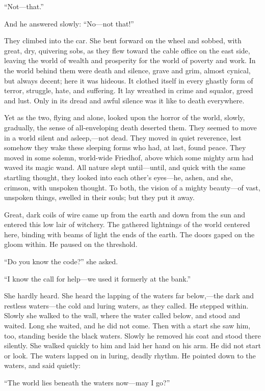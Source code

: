 ``Not---that.''

And he answered slowly: ``No---not that!''

They climbed into the car. She bent forward on the wheel and
sobbed, with great, dry, quivering sobs, as they flew toward the
cable office on the east side, leaving the world of wealth and
prosperity for the world of poverty and work. In the world
behind them were death and silence, grave and grim, almost
cynical, but always decent; here it was hideous. It clothed
itself in every ghastly form of terror, struggle, hate, and
suffering. It lay wreathed in crime and squalor, greed and lust.
Only in its dread and awful silence was it like to death
everywhere.

Yet as the two, flying and alone, looked upon the horror of the
world, slowly, gradually, the sense of all-enveloping death
deserted them. They seemed to move in a world silent and
asleep,---not dead. They moved in quiet reverence, lest somehow
they wake these sleeping forms who had, at last, found peace.
They moved in some solemn, world-wide Friedhof, above which some
mighty arm had waved its magic wand. All nature slept
until---until, and quick with the same startling thought, they
looked into each other's eyes---he, ashen, and she, crimson, with
unspoken thought. To both, the vision of a mighty beauty---of
vast, unspoken things, swelled in their souls; but they put it
away.

Great, dark coils of wire came up from the earth and down from
the sun and entered this low lair of witchery. The gathered
lightnings of the world centered here, binding with beams of
light the ends of the earth. The doors gaped on the gloom
within. He paused on the threshold.

``Do you know the code?'' she asked.

``I know the call for help---we used it formerly at the bank.''

She hardly heard. She heard the lapping of the waters far
below,---the dark and restless waters---the cold and luring waters,
as they called. He stepped within. Slowly she walked to the
wall, where the water called below, and stood and waited. Long
she waited, and he did not come. Then with a start she saw him,
too, standing beside the black waters. Slowly he removed his
coat and stood there silently. She walked quickly to him and
laid her hand on his arm. He did not start or look. The waters
lapped on in luring, deadly rhythm. He pointed down to the
waters, and said quietly:

``The world lies beneath the waters now---may I go?''

